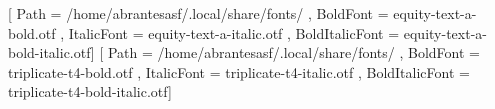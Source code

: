

\ifxetex
   \usepackage[tuenc,no-math]{fontspec}
   \setmainfont{equity-text-a-regular.otf}[
      Path           = /home/abrantesasf/.local/share/fonts/ ,
      BoldFont       = equity-text-a-bold.otf                ,
      ItalicFont     = equity-text-a-italic.otf              ,
      BoldItalicFont = equity-text-a-bold-italic.otf]
   \setmonofont{triplicate-t4-regular.otf}[
      Path           = /home/abrantesasf/.local/share/fonts/ ,
      BoldFont       = triplicate-t4-bold.otf                ,
      ItalicFont     = triplicate-t4-italic.otf              ,
      BoldItalicFont = triplicate-t4-bold-italic.otf]
\else
   \usepackage[T1]{fontenc}
   \usepackage[utf8]{inputenc}
   \renewcommand{\familydefault}{ppl}
\fi
